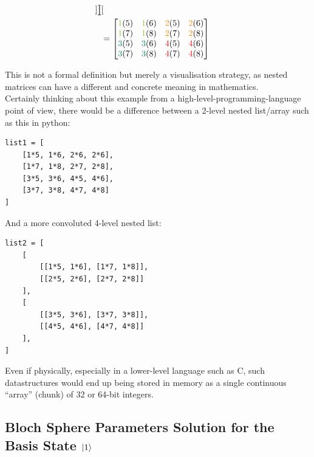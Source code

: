 \documentclass[conference]{IEEEtran}
\begin{document}
\begin{appendices}
\begin{equation*}
\begin{split}
\begin{bmatrix}
\begin{bmatrix}
\end{bmatrix} \\
\end{bmatrix} \\
& =
\begin{bmatrix}
\textcolor{LimeGreen}{1}(5) & \textcolor{LimeGreen}{1}(6) & \textcolor{orange}{2}(5) & \textcolor{orange}{2}(6) \\
\textcolor{LimeGreen}{1}(7) & \textcolor{LimeGreen}{1}(8) & \textcolor{orange}{2}(7) & \textcolor{orange}{2}(8) \\
\textcolor{PineGreen}{3}(5) & \textcolor{PineGreen}{3}(6) & \textcolor{Red}{4}(5) & \textcolor{Red}{4}(6) \\
\textcolor{PineGreen}{3}(7) & \textcolor{PineGreen}{3}(8) & \textcolor{Red}{4}(7) & \textcolor{Red}{4}(8)
\end{bmatrix}
\end{split}
\end{equation*}

This is not a formal definition but merely a visualisation strategy,
as nested matrices can have a different and concrete meaning in mathematics. \\

Certainly thinking about this example from a high-level-programming-language point of view,
there would be a difference between a 2-level nested list/array such as this in python:

\begin{verbatim}
list1 = [
    [1*5, 1*6, 2*6, 2*6],
    [1*7, 1*8, 2*7, 2*8],
    [3*5, 3*6, 4*5, 4*6],
    [3*7, 3*8, 4*7, 4*8]
]

\end{verbatim}

And a more convoluted 4-level nested list:

\begin{verbatim}
list2 = [
    [
        [[1*5, 1*6], [1*7, 1*8]],
        [[2*5, 2*6], [2*7, 2*8]]
    ],
    [
        [[3*5, 3*6], [3*7, 3*8]],
        [[4*5, 4*6], [4*7, 4*8]]
    ],
]
\end{verbatim}

Even if physically, especially in a lower-level language such as C, such datastructures
would end up being stored in memory as a single continuous ``array'' (chunk) of 32 or 64-bit integers. \\

\subsection{Bloch Sphere Parameters Solution for the Basis State $\ket{1}$}
\label{appendix:BlochSphereSolutionExample}


\end{appendices}
\end{document}
